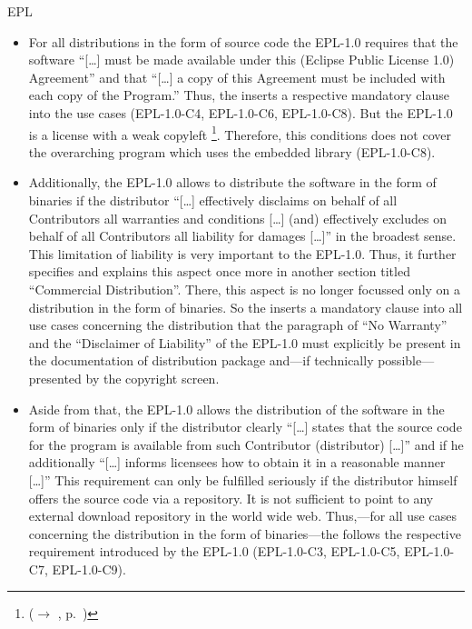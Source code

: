 \begin{license}{EPL}
\begin{itemize}
  \item For all distributions in the form of source code the EPL-1.0 requires that
    the software \enquote{[\ldots] must be made available under this (Eclipse
    Public License 1.0) Agreement} and that \enquote{[\ldots] a copy of this
    Agreement must be included with each copy of the Program.} 
    Thus, the \oslic{} inserts a respective mandatory clause into the use cases
    (EPL-1.0-C4, EPL-1.0-C6, EPL-1.0-C8). But the EPL-1.0 is a license with a weak copyleft%
    \footnote{($\rightarrow$ \oslic, p.\ )}. 
    Therefore, this conditions does not cover the overarching program which uses
    the embedded library (EPL-1.0-C8).
    
  \item Additionally, the EPL-1.0 allows to distribute the software in the form
    of binaries if the distributor \enquote{[\ldots] effectively disclaims on
    behalf of all Contributors all warranties and conditions [\ldots] (and)
    effectively excludes on behalf of all Contributors all liability for
    damages [\ldots]} in the broadest sense. This limitation of
    liability is very important to the EPL-1.0. Thus, it further specifies and
    explains this aspect once more in another section titled \enquote{Commercial
    Distribution}. There, this aspect is no longer focussed only on a
    distribution in the form of binaries. So the \oslic{} inserts a
    mandatory clause into all use cases concerning the distribution that the
    paragraph of \enquote{No Warranty} and the \enquote{Disclaimer
    of Liability} of the EPL-1.0 must explicitly be present in the
    documentation of distribution package and---if technically possible---%
    presented by the copyright screen.   
  
  \item Aside from that, the EPL-1.0 allows the distribution of the software in the
    form of binaries only if the distributor clearly \enquote{[\ldots] states that
    the source code for the program is available from such Contributor
    (distributor) [\ldots]} and if he additionally \enquote{[\ldots] informs
    licensees how to obtain it in a reasonable manner [\ldots]} 
    This requirement can only be fulfilled seriously if the distributor himself
    offers the source code via a repository. It is not sufficient to point to
    any external download repository in the world wide web. Thus,---for all use
    cases concerning the distribution in the form of binaries---the \oslic{}
    follows the respective requirement introduced by the EPL-1.0 (EPL-1.0-C3, EPL-1.0-C5,
    EPL-1.0-C7, EPL-1.0-C9).  
  

\end{itemize}
\end{license}
